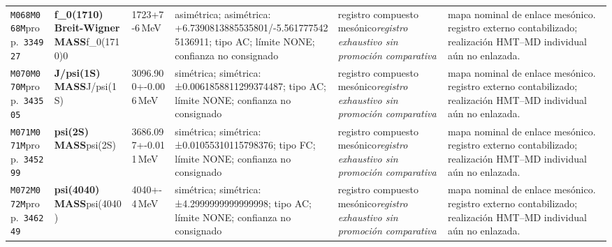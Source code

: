 \begin{landscape}
\begin{longtable}{L{1.85cm}L{4.45cm}L{2.35cm}L{4.05cm}L{3.35cm}L{7.15cm}}
\texttt{M068}\newline \texttt{M068M}\newline prop.\ \texttt{334927} & \textbf{f\_\allowbreak{}0(1710) Breit-Wigner MASS}\newline f\_\allowbreak{}0(1710)0 & 1723+7-6\,MeV & asimétrica; asimétrica: +6.7390813885535801/-5.5617775425136911; tipo AC; límite NONE; confianza no consignado & registro compuesto mesónico\newline \emph{registro exhaustivo sin promoción comparativa} & mapa nominal de enlace mesónico. registro externo contabilizado; realización HMT--MD individual aún no enlazada. \\
\texttt{M070}\newline \texttt{M070M}\newline prop.\ \texttt{343505} & \textbf{J/psi(1S) MASS}\newline J/psi(1S) & 3096.900+-0.006\,MeV & simétrica; simétrica: ±0.0061858811299374487; tipo AC; límite NONE; confianza no consignado & registro compuesto mesónico\newline \emph{registro exhaustivo sin promoción comparativa} & mapa nominal de enlace mesónico. registro externo contabilizado; realización HMT--MD individual aún no enlazada. \\
\texttt{M071}\newline \texttt{M071M}\newline prop.\ \texttt{345299} & \textbf{psi(2S) MASS}\newline psi(2S) & 3686.097+-0.011\,MeV & simétrica; simétrica: ±0.01055310115798376; tipo FC; límite NONE; confianza no consignado & registro compuesto mesónico\newline \emph{registro exhaustivo sin promoción comparativa} & mapa nominal de enlace mesónico. registro externo contabilizado; realización HMT--MD individual aún no enlazada. \\
\texttt{M072}\newline \texttt{M072M}\newline prop.\ \texttt{346249} & \textbf{psi(4040) MASS}\newline psi(4040) & 4040+-4\,MeV & simétrica; simétrica: ±4.2999999999999998; tipo AC; límite NONE; confianza no consignado & registro compuesto mesónico\newline \emph{registro exhaustivo sin promoción comparativa} & mapa nominal de enlace mesónico. registro externo contabilizado; realización HMT--MD individual aún no enlazada. \\

\end{longtable}
\end{landscape}

